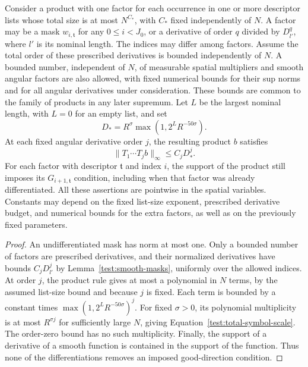 \begin{lemma}\label{test:product-symbols}
Consider a product with one factor for each occurrence in one or more
descriptor lists whose total size is at most $N^{C_*}$, with $C_*$ fixed
independently of $N$. A factor may be a mask $w_{i,\mathfrak t}$ for any
$0\le i<J_0$, or a derivative of order $q$ divided by $D_{l'}^q$, where
$l'$ is its nominal length. The indices may differ among factors. Assume
the total order of these prescribed derivatives is bounded independently
of $N$. A bounded number, independent of $N$, of measurable spatial
multipliers and smooth angular factors are also allowed, with fixed
numerical bounds for their sup norms and for all angular derivatives under
consideration. These bounds are common to the family of products in any
later supremum. Let $L$ be the largest nominal length, with $L=0$ for an
empty list, and set
\begin{equation}\label{test:total-symbol-scale}
D_*=R^\sigma\max(1,2^LR^{-50\sigma}).
\end{equation}
At each fixed angular derivative order $j$, the resulting product
$b$ satisfies
\[
\|T_1\cdots T_jb\|_\infty\le C_jD_*^j.
\]
For each factor with descriptor $\mathfrak t$ and index $i$, the support
of the product still imposes its $G_{i+1,\mathfrak t}$ condition, including
when that factor was already differentiated. All these assertions are
pointwise in the spatial variables. Constants may depend on the fixed
list-size exponent, prescribed derivative budget, and numerical bounds
for the extra factors, as well as on the previously fixed parameters.
\end{lemma}

\begin{proof}
An undifferentiated mask has norm at most one. Only a bounded number
of factors are prescribed derivatives, and their normalized derivatives
have bounds $C_jD_{l'}^j$ by Lemma~\ref{test:smooth-masks}, uniformly
over the allowed indices. At order $j$, the product rule gives
at most a polynomial in $N$ terms, by the assumed list-size bound
and because $j$ is fixed.  Each term is bounded by a
constant times $\max(1,2^LR^{-50\sigma})^j$.  For fixed
$\sigma>0$, its polynomial multiplicity is at most $R^{\sigma j}$
for sufficiently large $N$, giving
Equation~\eqref{test:total-symbol-scale}.  The order-zero bound has
no such multiplicity.  Finally, the support of a derivative of a
smooth function is contained in the support of the function.  Thus
none of the differentiations removes an imposed good-direction
condition.
\end{proof}

